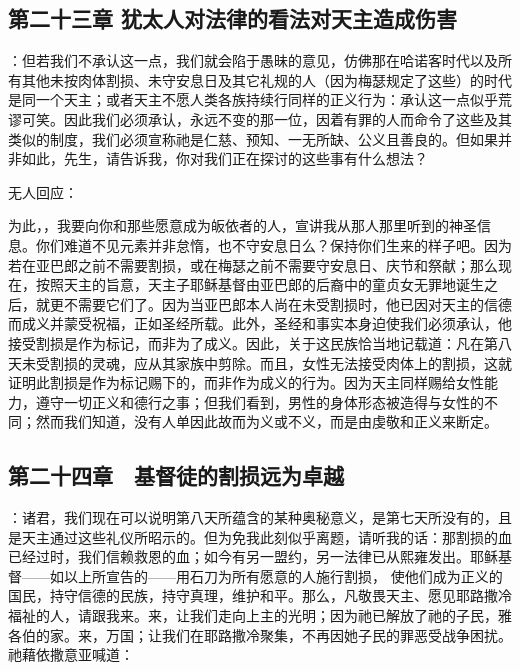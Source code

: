 
\subsection{第二十三章 犹太人对法律的看法对天主造成伤害}

：但若我们不承认这一点，我们就会陷于愚昧的意见，仿佛那在哈诺客时代以及所有其他未按肉体割损、未守安息日及其它礼规的人（因为梅瑟规定了这些）的时代是同一个天主；或者天主不愿人类各族持续行同样的正义行为：承认这一点似乎荒谬可笑。因此我们必须承认，永远不变的那一位，因着有罪的人而命令了这些及其类似的制度，我们必须宣称祂是仁慈、预知、一无所缺、公义且善良的。但如果并非如此，先生，请告诉我，你对我们正在探讨的这些事有什么想法？\par

无人回应：\par

为此，，我要向你和那些愿意成为皈依者的人，宣讲我从那人那里听到的神圣信息。你们难道不见元素并非怠惰，也不守安息日么？保持你们生来的样子吧。因为若在亚巴郎之前不需要割损，或在梅瑟之前不需要守安息日、庆节和祭献；那么现在，按照天主的旨意，天主子耶稣基督由亚巴郎的后裔中的童贞女无罪地诞生之后，就更不需要它们了。因为当亚巴郎本人尚在未受割损时，他已因对天主的信德而成义并蒙受祝福，正如圣经所载。此外，圣经和事实本身迫使我们必须承认，他接受割损是作为标记，而非为了成义。因此，关于这民族恰当地记载道：凡在第八天未受割损的灵魂，应从其家族中剪除。而且，女性无法接受肉体上的割损，这就证明此割损是作为标记赐下的，而非作为成义的行为。因为天主同样赐给女性能力，遵守一切正义和德行之事；但我们看到，男性的身体形态被造得与女性的不同；然而我们知道，没有人单因此故而为义或不义，而是由虔敬和正义来断定。\par


\subsection{第二十四章　基督徒的割损远为卓越}

：诸君，我们现在可以说明第八天所蕴含的某种奥秘意义，是第七天所没有的，且是天主通过这些礼仪所昭示的。但为免我此刻似乎离题，请听我的话：那割损的血已经过时，我们信赖救恩的血；如今有另一盟约，另一法律已从熙雍发出。耶稣基督——如以上所宣告的——用石刀为所有愿意的人施行割损， 使他们成为正义的国民，持守信德的民族，持守真理，维护和平。那么，凡敬畏天主、愿见耶路撒冷福祉的人，请跟我来。来，让我们走向上主的光明；因为祂已解放了祂的子民，雅各伯的家。来，万国；让我们在耶路撒冷聚集，不再因她子民的罪恶受战争困扰。祂藉依撒意亚喊道：\par

